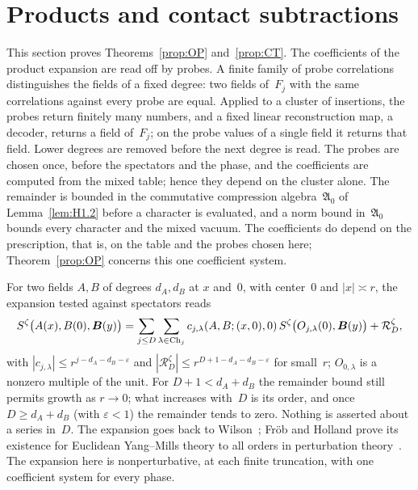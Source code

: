 \section{Products and contact subtractions}\label{sec:partII-J}

This section proves Theorems~\ref{prop:OP} and~\ref{prop:CT}. The coefficients of the product expansion are read off by probes. A finite family of probe correlations distinguishes the fields of a fixed degree: two fields of~$F_j$ with the same correlations against every probe are equal. Applied to a cluster of insertions, the probes return finitely many numbers, and a fixed linear reconstruction map, a decoder, returns a field of~$F_j$; on the probe values of a single field it returns that field. Lower degrees are removed before the next degree is read. The probes are chosen once, before the spectators and the phase, and the coefficients are computed from the mixed table; hence they depend on the cluster alone. The remainder is bounded in the commutative compression algebra~$\mathfrak A_0$ of Lemma~\ref{lem:H1.2} before a character is evaluated, and a norm bound in~$\mathfrak A_0$ bounds every character and the mixed vacuum. The coefficients do depend on the prescription, that is, on the table and the probes chosen here; Theorem~\ref{prop:OP} concerns this one coefficient system.

For two fields $A,B$ of degrees $d_A,d_B$ at $x$ and~$0$, with center~$0$ and $|x|\asymp r$, the expansion tested against spectators reads
\begin{equation*}
S^\zeta\bigl(A(x),B(0),\boldsymbol B(y)\bigr)
=\sum_{j\le D}\sum_{\lambda\in\mathrm{Ch}_{j}}c_{j,\lambda}(A,B;(x,0),0)\,
S^\zeta\bigl(O_{j,\lambda}(0),\boldsymbol B(y)\bigr)+\mathcal R_D^\zeta,
\end{equation*}
with $|c_{j,\lambda}|\le r^{j-d_A-d_B-\varepsilon}$ and $|\mathcal R_D^\zeta|\le r^{D+1-d_A-d_B-\varepsilon}$ for small~$r$; $O_{0,\lambda}$ is a nonzero multiple of the unit. For $D+1<d_A+d_B$ the remainder bound still permits growth as $r\to0$; what increases with~$D$ is its order, and once $D\ge d_A+d_B$ (with $\varepsilon<1$) the remainder tends to zero. Nothing is asserted about a series in~$D$. The expansion goes back to Wilson~\cite{Wilson1969}; Fr\"ob and Holland prove its existence for Euclidean Yang--Mills theory to all orders in perturbation theory~\cite{FrobHolland2016}. The expansion here is nonperturbative, at each finite truncation, with one coefficient system for every phase.

